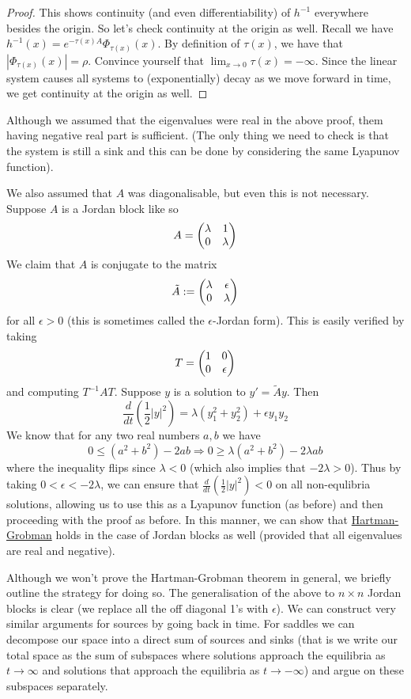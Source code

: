 \begin{proof}
This shows continuity (and even differentiability) of $h^{-1}$ everywhere besides the origin. So let's check continuity at the origin as well. Recall we have $h^{-1}(x) = e^{-\tau(x) A} \Phi_{\tau(x)}(x)$. By definition of $\tau(x)$, we have that $|\Phi_{\tau(x)}(x)| = \rho$. Convince yourself that $\lim_{x \to 0} \tau(x) = -\infty$. Since the linear system causes all systems to (exponentially) decay as we move forward in time, we get continuity at the origin as well.
\end{proof}

Although we assumed that the eigenvalues were real in the above proof, them having negative real part is sufficient. (The only thing we need to check is that the system is still a sink and this can be done by considering the same Lyapunov function).

We also assumed that $A$ was diagonalisable, but even this is not necessary. Suppose $A$ is a Jordan block like so
$$ A = \begin{pmatrix} \lambda & 1\\0 & \lambda \end{pmatrix} $$
We claim that $A$ is conjugate to the matrix
$$ \tilde{A} := \begin{pmatrix} \lambda & \epsilon \\0 & \lambda \end{pmatrix} $$
for all $\epsilon > 0$ (this is sometimes called the $\epsilon$-Jordan form). This is easily verified by taking
$$ T = \begin{pmatrix} 1 & 0\\0 & \epsilon \end{pmatrix} $$
and computing $T^{-1} A T$. Suppose $y$ is a solution to $y' = \tilde{A} y$. Then
$$ \frac{d}{dt} \left( \frac{1}{2} \left| y \right|^2 \right) = \lambda(y_1^2 + y_2^2) + \epsilon y_1 y_2 $$
We know that for any two real numbers $a, b$ we have
$$ 0 \leq (a^2 + b^2) - 2ab \Rightarrow 0 \geq \lambda (a^2 + b^2) - 2\lambda ab$$
where the inequality flips since $\lambda < 0$ (which also implies that $-2 \lambda > 0$). Thus by taking $0 < \epsilon < -2 \lambda$, we can ensure that $\frac{d}{dt} (\frac{1}{2} |y|^2) < 0$ on all non-equlibria solutions, allowing us to use this as a Lyapunov function (as before) and then proceeding with the proof as before. In this manner, we can show that \hyperref[thm:hartman-grobman]{Hartman-Grobman} holds in the case of Jordan blocks as well (provided that all eigenvalues are real and negative).

Although we won't prove the Hartman-Grobman theorem in general, we briefly outline the strategy for doing so. The generalisation of the above to $n \times n$ Jordan blocks is clear (we replace all the off diagonal 1's with $\epsilon$). We can construct very similar arguments for sources by going back in time. For saddles we can decompose our space into a direct sum of sources and sinks (that is we write our total space as the sum of subspaces where solutions approach the equilibria as $t \to \infty$ and solutions that approach the equilibria as $t \to -\infty$) and argue on these subspaces separately. 

